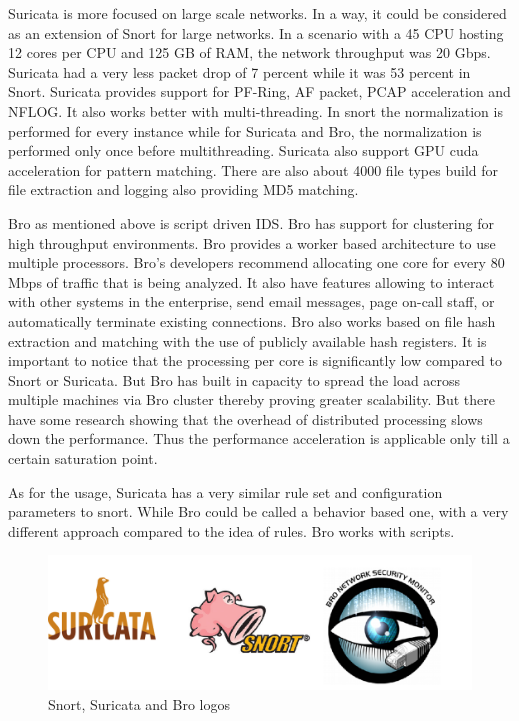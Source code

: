 \begin{itemize}[label=]
Suricata is more focused on large scale networks. In a way, it could be considered as an extension of Snort for large networks. In a scenario with a 45 CPU hosting 12 cores per CPU and 125 GB of RAM, the network throughput was 20 Gbps. Suricata had a very less packet drop of 7 percent while it was 53 percent in Snort. Suricata provides support for PF-Ring, AF packet, PCAP acceleration and NFLOG. It also works better with multi-threading. In snort the normalization is performed for every instance while for Suricata and Bro, the normalization is performed only once before multithreading. Suricata also support GPU cuda acceleration for pattern matching. There are also about 4000 file types build for file extraction and logging also providing MD5 matching. 

Bro as mentioned above is script driven IDS. Bro has support for clustering for high throughput environments. Bro provides a worker based architecture to use multiple processors. 
Bro’s developers recommend allocating one core for every 80 Mbps of traffic that is being analyzed.
It also have features allowing to interact with other systems in the enterprise, send email messages, page on-call staff, or automatically terminate existing connections. Bro also works based on file hash extraction and matching with the use of publicly available hash registers.
It is important to notice that the processing per core is significantly low compared to Snort or Suricata. But Bro has built in capacity to spread the load across multiple machines via Bro cluster thereby proving greater scalability. 
But there have some research showing that the overhead of distributed processing slows down the performance. Thus the performance acceleration is applicable only till a certain saturation point.

As for the usage, Suricata has a very similar rule set and configuration parameters to snort. While Bro could be called a behavior based one, with a very different approach compared to the idea of rules. Bro works with scripts. 

\begin{figure}[!htpb] 
\begin{center}
\includegraphics[height=1 in]{images/ATHENAnidss.png}
\end{center}
\caption{ Snort, Suricata and Bro logos }
\label{nidss}
\end{figure}


\end{itemize}
